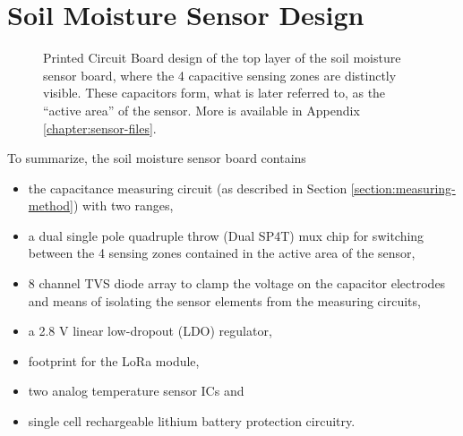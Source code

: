 \section{Soil Moisture Sensor Design}
\begin{figure}[H]
    
    \caption{\label{fig:sensor-pcb}Printed Circuit Board design of the top layer of the soil moisture sensor board, where the 4 capacitive sensing zones are distinctly visible. These capacitors form, what is later referred to, as the ``active area'' of the sensor. More is available in Appendix \ref{chapter:sensor-files}.}
\end{figure}
To summarize, the soil moisture sensor board contains
\begin{itemize}
    \item the capacitance measuring circuit (as described in Section \ref{section:measuring-method}) with two ranges,
    \item a dual single pole quadruple throw (Dual SP4T) mux chip for switching between the 4 sensing zones contained in the active area of the sensor,
    \item 8 channel TVS diode array to clamp the voltage on the capacitor electrodes and means of isolating the sensor elements from the measuring circuits,
    \item a 2.8 V linear low-dropout (LDO) regulator,
    \item footprint for the LoRa module,
    \item two analog temperature sensor ICs and
    \item single cell rechargeable lithium battery protection circuitry.
\end{itemize}

